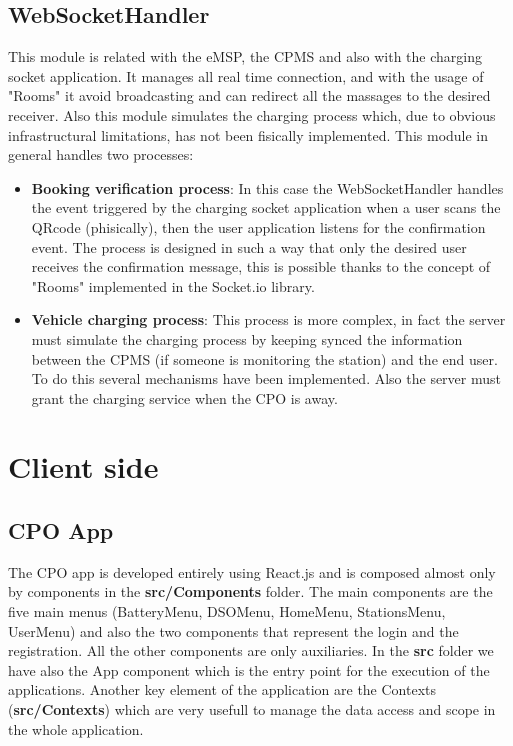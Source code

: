 \subsection{WebSocketHandler}
This module is related with the eMSP, the CPMS and also with the charging socket application. It manages all real time connection, and with the usage of "Rooms" it avoid broadcasting and can redirect all the massages to the desired receiver. Also this module simulates the charging process which, due to obvious infrastructural limitations, has not been fisically implemented. This module in general handles two processes:
\begin{itemize}
    \item \textbf{Booking verification process}: In this case the WebSocketHandler handles the event triggered by the charging socket application when a user scans the QRcode (phisically), then the user application listens for the confirmation event. The process is designed in such a way that only the desired user receives the confirmation message, this is possible thanks to the concept of "Rooms" implemented in the Socket.io library.
    \item \textbf{Vehicle charging process}: This process is more complex, in fact the server must simulate the charging process by keeping synced the information between the CPMS (if someone is monitoring the station) and the end user. To do this several mechanisms have been implemented. Also the server must grant the charging service when the CPO is away.
\end{itemize}
\section{Client side}
\subsection{CPO App}
The CPO app is developed entirely using React.js and is composed almost only by components in the \textbf{src/Components} folder. The main components are the five main menus (BatteryMenu, DSOMenu, HomeMenu, StationsMenu, UserMenu) and also the two components that represent the login and the registration. All the other components are only auxiliaries. In the \textbf{src} folder we have also the App component which is the entry point for the execution of the applications. Another key element of the application are the Contexts (\textbf{src/Contexts}) which are very usefull to manage the data access and scope in the whole application.
